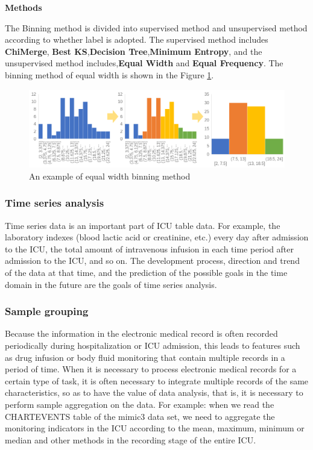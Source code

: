 \textbf{Methods}

The Binning method is divided into supervised method and unsupervised method according to whether label is adopted. The supervised method includes \textbf{ChiMerge}, \textbf{Best KS},\textbf{Decision Tree},\textbf{Minimum Entropy}, and the unsupervised method includes,\textbf{Equal Width} and \textbf{Equal Frequency}. The binning method of equal width is shown in the Figure \ref{fig:equal_width_bining}.

\begin{figure}[ht]
    \centering
    \includegraphics[width=0.9\linewidth]{images/equal_width_bining.png}
    \caption{An example of equal width binning method}
    \label{fig:equal_width_bining}
\end{figure}


\subsubsection{Time series analysis}
Time series data is an important part of ICU table data. For example, the laboratory indexes (blood lactic acid or creatinine, etc.) every day after admission to the ICU, the total amount of intravenous infusion in each time period after admission to the ICU, and so on. The development process, direction and trend of the data at that time, and the prediction of the possible goals in the time domain in the future are the goals of time series analysis.
\subsubsection{Sample grouping}
Because the information in the electronic medical record is often recorded periodically during hospitalization or ICU admission, this leads to features such as drug infusion or body fluid monitoring that contain multiple records in a period of time. When it is necessary to process electronic medical records for a certain type of task, it is often necessary to integrate multiple records of the same characteristics, so as to have the value of data analysis, that is, it is necessary to perform sample aggregation on the data. For example: when we read the CHARTEVENTS table of the mimic3 data set, we need to aggregate the monitoring indicators in the ICU according to the mean, maximum, minimum or median and other methods in the recording stage of the entire ICU.

